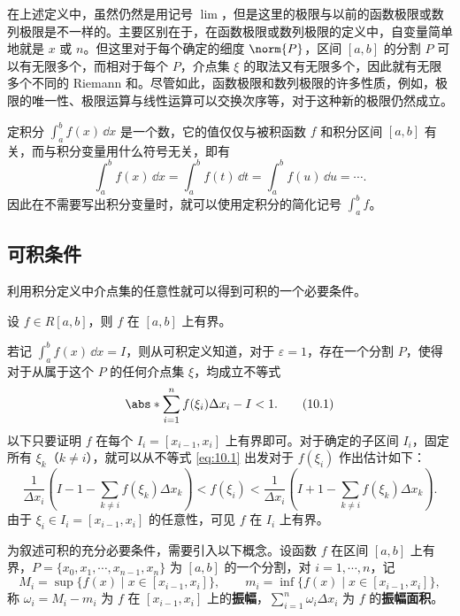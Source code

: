 \begin{xremark}
在上述定义中，虽然仍然是用记号 $\lim$，但是这里的极限与以前的函数极限或数列极限是不一样的。主要区别在于，在函数极限或数列极限的定义中，自变量简单地就是 $x$ 或 $n$。但这里对于每个确定的细度 $\norm{P}$，区间 $[a,b]$ 的分割 $P$ 可以有无限多个，而相对于每个 $P$，介点集 $\xi$ 的取法又有无限多个，因此就有无限多个不同的 Riemann 和。尽管如此，函数极限和数列极限的许多性质，例如，极限的唯一性、极限运算与线性运算可以交换次序等，对于这种新的极限仍然成立。
\end{xremark}

\begin{xremark}
定积分 $\int_a^b f(x)\,\dd x$ 是一个数，它的值仅仅与被积函数 $f$ 和积分区间 $[a,b]$ 有关，而与积分变量用什么符号无关，即有
\[
  \int_a^b f(x)\,\dd x=\int_a^b f(t)\,\dd t=\int_a^b f(u)\,\dd u=\cdots.
\]
因此在不需要写出积分变量时，就可以使用定积分的简化记号 $\int_a^b f$。
\end{xremark}

\subsection{可积条件}

利用积分定义中介点集的任意性就可以得到可积的一个必要条件。

\begin{xtheorem}[10.1.1]
设 $f\in R[a,b]$，则 $f$ 在 $[a,b]$ 上有界。
\end{xtheorem}
\begin{xproof}
若记 $\int_a^b f(x)\,\dd x=I$，则从可积定义知道，对于 $\varepsilon=1$，存在一个分割 $P$，使得对于从属于这个 $P$ 的任何介点集 $\xi$，均成立不等式
\begin{equation}
  \abs*{\sum_{i=1}^n f(\xi_i)\Delta x_i-I}<1.
  \tag{10.1}
  \label{eq:10.1}
\end{equation}
以下只要证明 $f$ 在每个 $I_i=[x_{i-1},x_i]$ 上有界即可。对于确定的子区间 $I_i$，固定所有 $\xi_k$（$k\ne i$），就可以从不等式 \eqref{eq:10.1} 出发对于 $f(\xi_i)$ 作出估计如下：
\[
  \frac{1}{\Delta x_i}\left(I-1-\sum_{k\ne i}f(\xi_k)\Delta x_k\right)
  <f(\xi_i)<
  \frac{1}{\Delta x_i}\left(I+1-\sum_{k\ne i}f(\xi_k)\Delta x_k\right).
\]
由于 $\xi_i\in I_i=[x_{i-1},x_i]$ 的任意性，可见 $f$ 在 $I_i$ 上有界。
\end{xproof}

为叙述可积的充分必要条件，需要引入以下概念。设函数 $f$ 在区间 $[a,b]$ 上有界，$P=\{x_0,x_1,\cdots,x_{n-1},x_n\}$ 为 $[a,b]$ 的一个分割，对 $i=1,\cdots,n$，记
\[
  M_i=\sup\{f(x)\mid x\in[x_{i-1},x_i]\},
  \qquad
  m_i=\inf\{f(x)\mid x\in[x_{i-1},x_i]\},
\]
称 $\omega_i=M_i-m_i$ 为 $f$ 在 $[x_{i-1},x_i]$ 上的\textbf{振幅}，$\sum_{i=1}^n\omega_i\Delta x_i$ 为 $f$ 的\textbf{振幅面积}。

